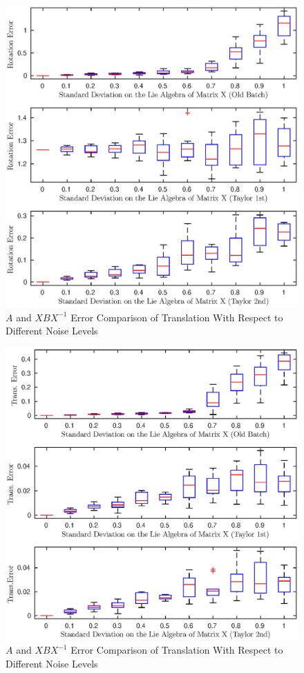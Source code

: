 \documentclass[twocolumn,10pt]{asme2ej}
\begin{document}
\begin{figure}[h]
\includegraphics[scale=0.5]{mean_rot_error.eps}
\caption{$A$ and $XBX^{-1}$ Error Comparison of Translation With Respect to Different Noise Levels}
\centering
\label{rotaxbxconv}
\end{figure}

\begin{figure}[h]
\includegraphics[scale=0.5]{mean_trans_error.eps}
\caption{$A$ and $XBX^{-1}$ Error Comparison of Translation With Respect to Different Noise Levels}
\centering
\label{taxbxconv}
\end{figure}
\end{document}
